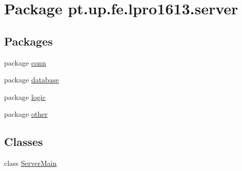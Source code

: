 \hypertarget{namespacept_1_1up_1_1fe_1_1lpro1613_1_1server}{}\section{Package pt.\+up.\+fe.\+lpro1613.\+server}
\label{namespacept_1_1up_1_1fe_1_1lpro1613_1_1server}
\subsection*{Packages}
\begin{DoxyCompactItemize}
\item 
package \hyperlink{namespacept_1_1up_1_1fe_1_1lpro1613_1_1server_1_1conn}{conn}
\item 
package \hyperlink{namespacept_1_1up_1_1fe_1_1lpro1613_1_1server_1_1database}{database}
\item 
package \hyperlink{namespacept_1_1up_1_1fe_1_1lpro1613_1_1server_1_1logic}{logic}
\item 
package \hyperlink{namespacept_1_1up_1_1fe_1_1lpro1613_1_1server_1_1other}{other}
\end{DoxyCompactItemize}
\subsection*{Classes}
\begin{DoxyCompactItemize}
\item 
class \hyperlink{classpt_1_1up_1_1fe_1_1lpro1613_1_1server_1_1_server_main}{Server\+Main}
\end{DoxyCompactItemize}
